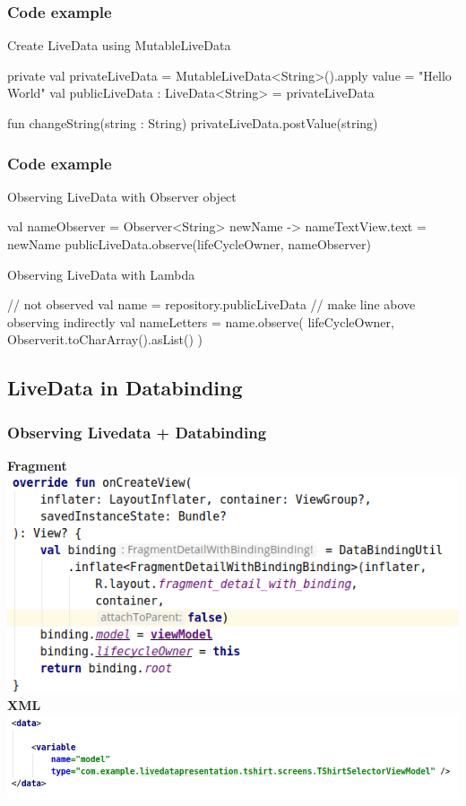 \documentclass{beamer}
\begin{document}
	\begin{frame}[fragile]
	\frametitle{Code example}
		\begin{block}{Create LiveData using MutableLiveData}
		\begin{spverbatim}
			private val privateLiveData = MutableLiveData<String>().apply{
			value = "Hello World"
			}
			val publicLiveData : LiveData<String> = privateLiveData
			
			fun changeString(string : String){
			privateLiveData.postValue(string)
			}
		\end{spverbatim}
	\end{block}
	\end{frame}
	
	\begin{frame}[fragile]
	\frametitle{Code example}
		\begin{block}{Observing LiveData with Observer object}
			\begin{spverbatim}
			val nameObserver = Observer<String> { newName ->
        	nameTextView.text = newName
    		}
			publicLiveData.observe(lifeCycleOwner, nameObserver)
		\end{spverbatim}
	\end{block}
	\begin{block}{Observing LiveData with Lambda}
		\begin{spverbatim}
			// not observed
			val name = repository.publicLiveData
			// make line above observing indirectly
			val nameLetters = name.observe(
			lifeCycleOwner,
			Observer{it.toCharArray().asList()}
			)
		\end{spverbatim}
	\end{block}
	\end{frame}
	
	\subsection[LiveData in Databinding]{LiveData in Databinding}
	\begin{frame}
	\frametitle{Observing Livedata + Databinding }
	\textbf{Fragment}
	\includegraphics[width=1\textwidth]{DataBindingInFragment.png}
	\textbf{XML}
	\includegraphics[width=1\textwidth]{DataBindingInXML.png}
	\end{frame}
	
\end{document}
